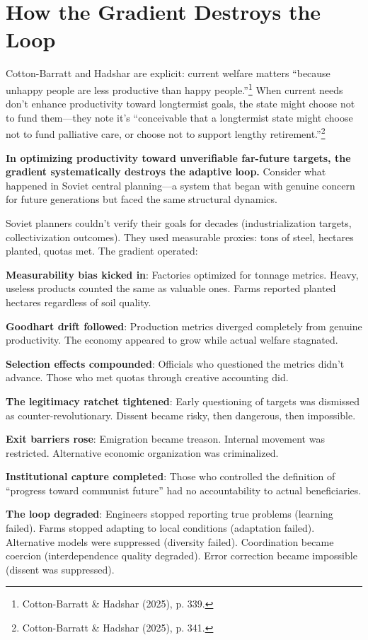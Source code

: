 \documentclass[12pt,a4paper]{article}
\begin{document}
\section{How the Gradient Destroys the Loop}

Cotton-Barratt and Hadshar are explicit: current welfare matters ``because unhappy people are less productive than happy people.''\footnote{Cotton-Barratt \& Hadshar (2025), p. 339.} When current needs don't enhance productivity toward longtermist goals, the state might choose not to fund them---they note it's ``conceivable that a longtermist state might choose not to fund palliative care, or choose not to support lengthy retirement.''\footnote{Cotton-Barratt \& Hadshar (2025), p. 341.}

\textbf{In optimizing productivity toward unverifiable far-future targets, the gradient systematically destroys the adaptive loop.} Consider what happened in Soviet central planning---a system that began with genuine concern for future generations but faced the same structural dynamics.

Soviet planners couldn't verify their goals for decades (industrialization targets, collectivization outcomes). They used measurable proxies: tons of steel, hectares planted, quotas met. The gradient operated:

\textbf{Measurability bias kicked in}: Factories optimized for tonnage metrics. Heavy, useless products counted the same as valuable ones. Farms reported planted hectares regardless of soil quality.

\textbf{Goodhart drift followed}: Production metrics diverged completely from genuine productivity. The economy appeared to grow while actual welfare stagnated.

\textbf{Selection effects compounded}: Officials who questioned the metrics didn't advance. Those who met quotas through creative accounting did.

\textbf{The legitimacy ratchet tightened}: Early questioning of targets was dismissed as counter-revolutionary. Dissent became risky, then dangerous, then impossible.

\textbf{Exit barriers rose}: Emigration became treason. Internal movement was restricted. Alternative economic organization was criminalized.

\textbf{Institutional capture completed}: Those who controlled the definition of ``progress toward communist future'' had no accountability to actual beneficiaries.

\textbf{The loop degraded}: Engineers stopped reporting true problems (learning failed). Farms stopped adapting to local conditions (adaptation failed). Alternative models were suppressed (diversity failed). Coordination became coercion (interdependence quality degraded). Error correction became impossible (dissent was suppressed).
\end{document}
